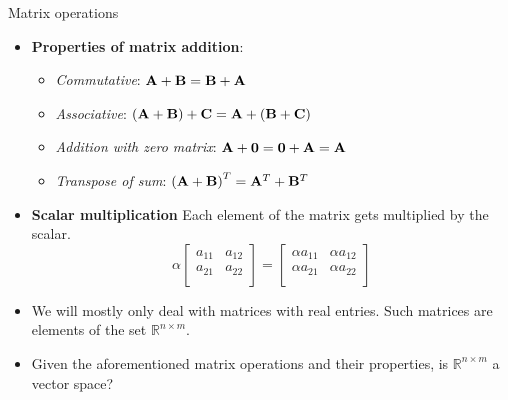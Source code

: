 \documentclass[aspectratio=169]{beamer}
\def\mf{\ensuremath\mathbf}
\begin{document}
\begin{frame}[t]{Matrix operations}
\begin{itemize}
\item \textbf{Properties of matrix addition}:
\begin{itemize}
\item \textit{Commutative}: $\mf{A} + \mf{B} = \mf{B} + \mf{A}$
\item \textit{Associative}: $\left(\mf{A} + \mf{B}\right) + \mf{C} = \mf{A} + \left(\mf{B} + \mf{C}\right)$
\item \textit{Addition with zero matrix}: $\mf{A} + \mf{0} = \mf{0} + \mf{A} = \mf{A}$
\item \textit{Transpose of sum}: $\left(\mf{A} + \mf{B}\right)^T = \mf{A}^T + \mf{B}^T$
\end{itemize}
\item \textbf{Scalar multiplication} Each element of the matrix gets multiplied by the scalar.
\[ \alpha \begin{bmatrix}
a_{11} & a_{12}\\
a_{21} & a_{22}\\
\end{bmatrix} = \begin{bmatrix}
\alpha a_{11} & \alpha a_{12} \\
\alpha a_{21} & \alpha a_{22} \\
\end{bmatrix}\]
\item We will mostly only deal with matrices with real entries. Such matrices are elements of the set $\mathbb{R}^{n\times m}$.
\item Given the aforementioned matrix operations and their properties, is $\mathbb{R}^{n\times m}$ a vector space?
\end{itemize}
\end{frame}
\end{document}
